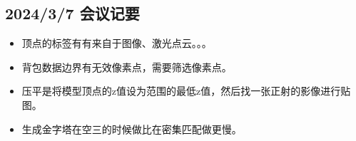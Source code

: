 \subsection{2024/3/7 会议记要}

\begin{itemize}
    \item 顶点的标签有有来自于图像、激光点云。。。
    \item 背包数据边界有无效像素点，需要筛选像素点。
    \item 压平是将模型顶点的z值设为范围的最低z值，然后找一张正射的影像进行贴图。
    \item 生成金字塔在空三的时候做比在密集匹配做更慢。
\end{itemize}